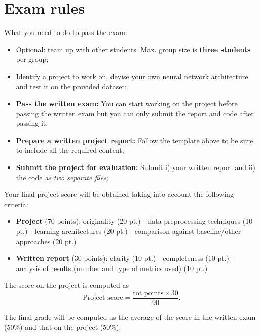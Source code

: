 \documentclass[10pt, conference, letterpaper]{IEEEtran}
\begin{document}






\section{Exam rules}

What you need to do to pass the exam:
\begin{itemize}
\item Optional: team up with other students. Max. group size is \textbf{three students} per group;
\item Identify a project to work on, devise your own neural network architecture and test it on the provided dataset;
\item \textbf{Pass the written exam:} You can start working on the project before passing the written exam but you can only submit the report and code after passing it.
\item \textbf{Prepare a written project report:} Follow the template above to be sure to include all the required content;
\item \textbf{Submit the project for evaluation:} Submit i) your written report and ii) the code \textit{as two separate files};
\end{itemize}

Your final project score will be obtained taking into account the following criteria:
\begin{itemize} 
\item \textbf{Project} (70 points): originality (20 pt.) - data preprocessing techniques (10 pt.) - learning architectures (20 pt.) - comparison against baseline/other approaches (20 pt.) 
\item \textbf{Written report} (30 points): clarity (10 pt.) - completeness (10 pt.) - analysis of results (number and type of metrics used) (10 pt.)
\end{itemize}

The score on the project is computed as
\begin{equation}
\textrm{Project score} = \frac{\textrm{tot\_points} \times 30}{90}.
\end{equation}

The final grade will be computed as the average of the score in the written exam (50\%) and that on the project (50\%).




\end{document}
